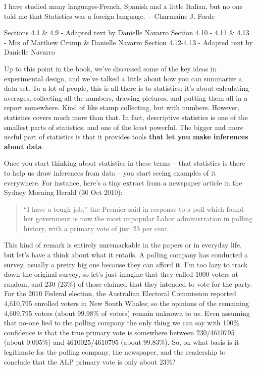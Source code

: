 \documentclass[]{book}
\newenvironment{marginnote}%
  {\itshape}%
  {}
\begin{document}
{
I have studied many languages-French, Spanish and a little Italian, but no one told me that Statistics was a foreign language.
---Charmaine J. Forde
}

\begin{marginnote}

Sections 4.1 \& 4.9 - Adapted text by Danielle Navarro
Section 4.10 - 4.11 \& 4.13 - Mix of Matthew Crump \& Danielle Navarro
Section 4.12-4.13 - Adapted text by Danielle Navarro

\end{marginnote}

Up to this point in the book, we've discussed some of the key ideas in experimental design, and we've talked a little about how you can summarize a data set. To a lot of people, this is all there is to statistics: it's about calculating averages, collecting all the numbers, drawing pictures, and putting them all in a report somewhere. Kind of like stamp collecting, but with numbers. However, statistics covers much more than that. In fact, descriptive statistics is one of the smallest parts of statistics, and one of the least powerful. The bigger and more useful part of statistics is that it provides tools \textbf{that let you make inferences about data}.

Once you start thinking about statistics in these terms -- that statistics is there to help us draw inferences from data -- you start seeing examples of it everywhere. For instance, here's a tiny extract from a newspaper article in the Sydney Morning Herald (30 Oct 2010):

\begin{quote}
``I have a tough job,'' the Premier said in response to a poll which found her government is now the most unpopular Labor administration in polling history, with a primary vote of just 23 per cent.
\end{quote}

This kind of remark is entirely unremarkable in the papers or in everyday life, but let's have a think about what it entails. A polling company has conducted a survey, usually a pretty big one because they can afford it. I'm too lazy to track down the original survey, so let's just imagine that they called 1000 voters at random, and 230 (23\%) of those claimed that they intended to vote for the party. For the 2010 Federal election, the Australian Electoral Commission reported 4,610,795 enrolled voters in New South Whales; so the opinions of the remaining 4,609,795 voters (about 99.98\% of voters) remain unknown to us. Even assuming that no-one lied to the polling company the only thing we can say with 100\% confidence is that the true primary vote is somewhere between 230/4610795 (about 0.005\%) and 4610025/4610795 (about 99.83\%). So, on what basis is it legitimate for the polling company, the newspaper, and the readership to conclude that the ALP primary vote is only about 23\%?
\end{document}
